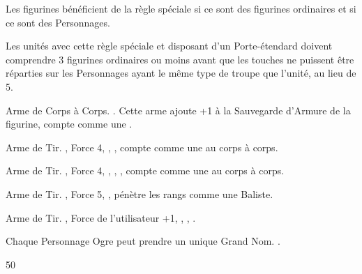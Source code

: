 {

\startarmyspecialrules

\armyspecialruleentry{\sonsoftheavalanche}

Les figurines  bénéficient de la règle spéciale  si ce sont des figurines ordinaires et  si ce sont des Personnages.


\armyspecialruleentry{\scraplinglookout}

Les unités avec cette règle spéciale et disposant d'un Porte-étendard doivent comprendre 3 figurines ordinaires ou moins avant que les touches ne puissent être réparties sur les Personnages ayant le même type de troupe que l'unité, au lieu de 5.

\closearmyspecialrules

\startarmyarmoury

\startitemlist

\listitem{\ironfist} Arme de Corps à Corps. \requirestwohands{}. Cette arme ajoute +1 à la Sauvegarde d'Armure de la figurine, compte comme une \pw{} .

\listitem{\ogrepistol} Arme de Tir. , Force 4, \quicktofire{}, , compte comme une \pw{} au corps à corps.

\listitem{\braceofogrepistols} Arme de Tir. , Force 4, \quicktofire{}, , , compte comme une \pw{} au corps à corps.

\listitem{\ogrecrossbow} Arme de Tir. , Force 5, , pénètre les rangs comme une Baliste.

\listitem{\huntingspear} Arme de Tir. , Force de l'utilisateur +1, \quicktofire{}, , .

\enditemlist

\closearmyarmoury



Chaque Personnage Ogre peut prendre un unique Grand Nom. .

\startpricelist

}{50}

\endpricelist


\closearmynewsection

